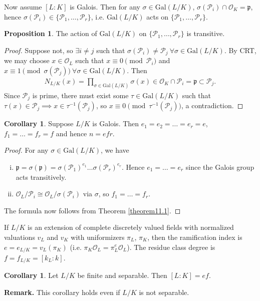 \documentclass{article}
\theoremstyle{definition}
\newtheorem{cor}[theorem]{Corollary}
\newtheorem{prop}[theorem]{Proposition}
\begin{document}
Now assume $[L:K]$ is Galois. Then for any $\sigma \in \text{Gal}(L/K)$, $\sigma(\mathcal{P}_i) \cap \mathcal{O}_K =\mathfrak{p}$, hence $\sigma(\mathcal{P}_i) \in \{\mathcal{P}_1,\ldots,\mathcal{P}_r\}$, i.e. $\text{Gal}(L/K)$ acts on $\{\mathcal{P}_1,\ldots,\mathcal{P}_r\}$.
\begin{prop}\label{prop11.2}
    The action of $\text{Gal}(L/K)$ on $\{\mathcal{P}_1,\ldots,\mathcal{P}_r\}$ is transitive.
\end{prop}
\begin{proof}
    Suppose not, so $\exists i \neq j$ such that $\sigma(\mathcal{P}_i) \neq \mathcal{P}_j ~\forall \sigma \in \text{Gal}(L/K)$. By CRT, we may choose $x \in \mathcal{O}_L$ such that $x \equiv 0 \pmod{\mathcal{P}_i}$ and $x \equiv 1 \pmod{\sigma(\mathcal{P}_j)}~\forall \sigma \in \text{Gal}(L/K)$. Then 
    \begin{align*}
        N_{L/K}(x) = \prod_{\sigma \in \text{Gal}(L/K)}^{} \sigma(x) \in \mathcal{O}_K \cap\mathcal{P}_i = \mathfrak{p} \subset \mathcal{P}_j. 
    \end{align*}
    Since $\mathcal{P}_j$ is prime, there must exist some $\tau \in \text{Gal}(L/K)$ such that $\tau(x) \in \mathcal{P}_j \implies x \in \tau^{-1}(\mathcal{P}_j)$, so $x \equiv 0 \pmod{\tau^{-1}(\mathcal{P}_j)}$, a contradiction.
\end{proof}
\begin{cor}\label{cor11.3}
    Suppose $L/K$ is Galois. Then $e_1 = e_2 = \ldots = e_r = e$, $f_1 = \ldots = f_r = f$ and hence $n = efr$.
\end{cor}
\begin{proof}
    For any $\sigma \in \text{Gal}(L/K)$, we have 
    \begin{enumerate}[(i)]
        \item $\mathfrak{p} = \sigma(\mathfrak{p}) = \sigma(\mathcal{P}_1)^{e_1}\ldots \sigma(\mathcal{P}_r)^{e_r}$. Hence $e_1 = \ldots = e_r$ since the Galois group acts transitively.
        \item $\mathcal{O}_L/\mathcal{P}_i \cong \mathcal{O}_L/\sigma(\mathcal{P}_i)$ via $\sigma$, so $f_1 = \ldots = f_r$.
    \end{enumerate}
    The formula now follows from Theorem \ref{theorem11.1}.
\end{proof}
If $L/K$ is an extension of complete discretely valued fields with normalized valuations $v_L$ and $v_K$ with uniformizers $\pi_L$, $\pi_K$, then the ramification index is $e = e_{L/K} = v_L(\pi_K)$ (i.e. $\pi_K \mathcal{O}_L = \pi_L^e \mathcal{O}_L$). The residue class degree is $f = f_{L/K} = [k_L:k]$.
\begin{cor}\label{cor11.4}
    Let $L/K$ be finite and separable. Then $[L:K] = ef$.
\end{cor}
\textbf{Remark.} This corollary holds even if $L/K$ is not separable.
\end{document}

